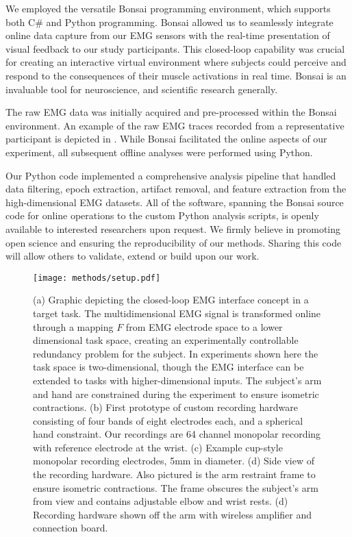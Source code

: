 \documentclass[../main.tex]{subfiles}
\begin{document}
We employed the versatile Bonsai programming environment, which supports both C\# and Python programming. Bonsai allowed us to seamlessly integrate online data capture from our EMG sensors with the real-time presentation of visual feedback to our study participants. This closed-loop capability was crucial for creating an interactive virtual environment where subjects could perceive and respond to the consequences of their muscle activations in real time. Bonsai is an invaluable tool for neuroscience, and scientific research generally.

The raw EMG data was initially acquired and pre-processed within the Bonsai environment. An example of the raw EMG traces recorded from a representative participant is depicted in . While Bonsai facilitated the online aspects of our experiment, all subsequent offline analyses were performed using Python.

Our Python code implemented a comprehensive analysis pipeline that handled data filtering, epoch extraction, artifact removal, and feature extraction from the high-dimensional EMG datasets. All of the software, spanning the Bonsai source code for online operations to the custom Python analysis scripts, is openly available to interested researchers upon request. We firmly believe in promoting open science and ensuring the reproducibility of our methods. Sharing this code will allow others to validate, extend or build upon our work.

\begin{figure}[!htb]
\centering
\texttt{[image: methods/setup.pdf]}
\caption[Experimental setup prototype]{(a) Graphic depicting the closed-loop EMG interface concept in a target task. The multidimensional EMG signal is transformed online through a mapping $F$ from EMG electrode space to a lower dimensional task space, creating an experimentally controllable redundancy problem for the subject. In experiments shown here the task space is two-dimensional, though the EMG interface can be extended to tasks with higher-dimensional inputs. The subject's arm and hand are constrained during the experiment to ensure isometric contractions. (b) First prototype of custom recording hardware consisting of four bands of eight electrodes each, and a spherical hand constraint. Our recordings are 64 channel monopolar recording with reference electrode at the wrist. (c) Example cup-style monopolar recording electrodes, 5mm in diameter. (d) Side view of the recording hardware. Also pictured is the arm restraint frame to ensure isometric contractions. The frame obscures the subject's arm from view and contains adjustable elbow and wrist rests. (d) Recording hardware shown off the arm with wireless amplifier and connection board.}\label{fig:prototype_setup}
\end{figure}
\end{document}
